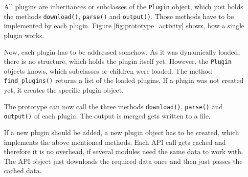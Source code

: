 All plugins are inheritances or subclasses of the \texttt{Plugin} object, which
just holds the methods \texttt{download()}, \texttt{parse()} and
\texttt{output()}. Those methods have to be implemented by each plugin. Figure
\ref{fig:prototype_activity} shows, how a single plugin works.

Now, each plugin has to be addressed somehow. As it was dynamically loaded,
there is no structure, which holds the plugin itself yet. However, the
\texttt{Plugin} objects knows, which subclasses or children were loaded. The
method \texttt{find\_plugins()} returns a list of the loaded plugins. If a
plugin was not created yet, it creates the specific plugin object.

The prototype can now call the three methods \texttt{download()},
\texttt{parse()} and \texttt{output()} of each plugin. The output is merged
gets written to a file.

If a new plugin should be added, a new plugin object has to be created, which
implements the above mentioned methods. Each API call gets cached and therefore
it is no overhead, if several modules need the same data to work with. The API
object just downloads the required data once and then just passes the cached
data.

